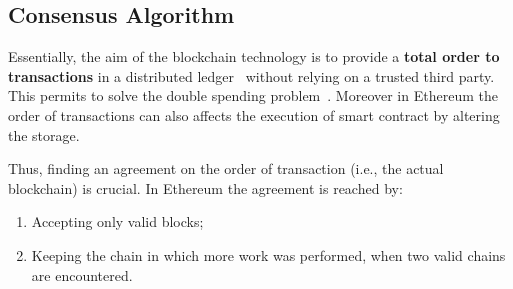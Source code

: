 \subsection{Consensus Algorithm}
\label{sec:consensus}

Essentially, the aim of the blockchain technology
is to provide a \textbf{total order to transactions} in a distributed
ledger~\cite{bib:the-quest} without relying on a trusted third party.
This permits to solve the double spending problem~\cite{bib:bitcoin}.
Moreover in Ethereum the order of transactions can also affects the execution
of smart contract by altering the storage.

Thus, finding an agreement on the order of transaction (i.e., the actual
blockchain) is crucial.
In Ethereum the agreement is reached by:
\begin{enumerate}
	\item Accepting only valid blocks;
	\item Keeping the chain in which more work was performed, when two valid
	chains are encountered.
\end{enumerate}




